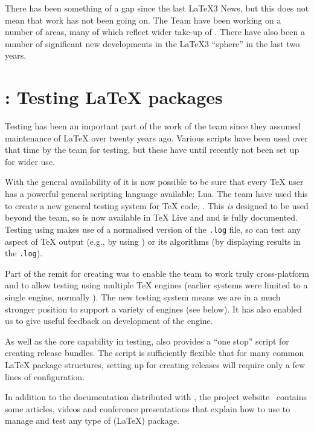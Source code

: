 \documentclass{ltnews}
\begin{document}
\maketitle

There has been something of a gap since the last \LaTeX3 News, but this does
not mean that work has not been going on. The Team have been working on a
number of areas, many of which reflect wider take-up of . There have
also been a number of significant new developments in the \LaTeX3
\enquote{sphere} in the last two years.

\section{: Testing \LaTeX{} packages}

Testing has been an important part of the work of the team since they assumed
maintenance of \LaTeX{} over twenty years ago. Various scripts have been used
over that time by the team for testing, but these have until recently not been
set up for wider use.

With the general availability of  it is now possible to be sure
that every \TeX{} user has a powerful general scripting language available:
Lua. The team have used this to create a new general testing system for \TeX{}
code, . This \emph{is} designed to be used beyond the team, so is
now available in \TeX{} Live and  and is fully documented.
Testing using  makes use of a normalised version of the
\texttt{.log} file, so can test any aspect of \TeX{} output (e.g., by using
) or its algorithms (by displaying results in the \texttt{.log}).

Part of the remit for creating  was to enable the team to work
truly cross-platform and to allow testing using multiple \TeX{} engines
(earlier systems were limited to a single engine, normally \eTeX{}). The new
testing system means we are in a much stronger position to support a variety of
engines (see below). It has also enabled us to give useful feedback on
development of the  engine.

As well as the core capability in testing,  also provides a
\enquote{one stop} script for creating release bundles. The script is
sufficiently flexible that for many common \LaTeX{} package structures, setting
up for creating releases will require only a few lines of configuration.

In addition to the documentation distributed with , the project
website~\cite[publications in 2014]{10:project-publications} contains some
articles, videos and conference presentations that explain how to use
 to manage and test any type of (\LaTeX{}) package.
\end{document}
